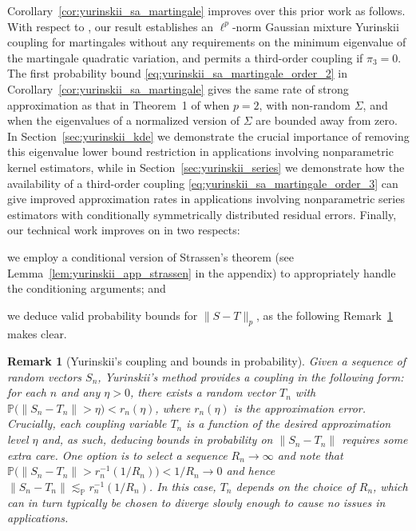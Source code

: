 \documentclass[11pt,lof]{puthesis}
\renewcommand{\P}{\ensuremath{\mathbb{P}}}
\theoremstyle{break}
\newtheorem{remark}{Remark}[section]
\theoremstyle{proof}
\begin{document}
Corollary~\ref{cor:yurinskii_sa_martingale} improves over this prior work as
follows.
With respect to \citet{li2020uniform}, our result establishes an $\ell^p$-norm
Gaussian mixture Yurinskii coupling for martingales without any requirements on
the minimum eigenvalue of the martingale quadratic variation, and permits a
third-order coupling if $\pi_3=0$. The first probability bound
\eqref{eq:yurinskii_sa_martingale_order_2} in
Corollary~\ref{cor:yurinskii_sa_martingale} gives the
same rate of strong approximation as that in Theorem~1 of \citet{li2020uniform}
when $p=2$, with non-random $\Sigma$, and when the eigenvalues of a normalized
version of $\Sigma$ are bounded away from zero. In
Section~\ref{sec:yurinskii_kde} we
demonstrate the crucial importance of removing this eigenvalue lower bound
restriction in applications involving nonparametric kernel estimators, while in
Section~\ref{sec:yurinskii_series} we demonstrate how the availability of a
third-order coupling \eqref{eq:yurinskii_sa_martingale_order_3} can give
improved approximation rates in applications involving nonparametric series
estimators with conditionally symmetrically distributed residual errors.
Finally, our technical work improves on \citet{li2020uniform} in two respects:
%
\begin{inlineroman}
  \item
    we employ a conditional version
    of Strassen's theorem (see Lemma~\ref{lem:yurinskii_app_strassen}
    in the appendix)
    to appropriately handle the conditioning arguments; and
  \item
    we deduce valid
    probability bounds for $\|S-T\|_p$, as the following
    Remark~\ref{rem:yurinskii_coupling_bounds_probability} makes clear.
\end{inlineroman}

\begin{remark}[Yurinskii's coupling and bounds in probability]
  \label{rem:yurinskii_coupling_bounds_probability}
  Given a sequence of random vectors $S_n$, Yurinskii's method provides a
  coupling in the following form: for each $n$ and any $\eta > 0$, there exists
  a random vector $T_n$ with $\P\big(\|S_n - T_n\| > \eta\big) < r_n(\eta)$,
  where $r_n(\eta)$ is the approximation error. Crucially, each coupling
  variable $T_n$ is a function of the desired approximation level $\eta$ and,
  as such, deducing bounds in probability on $\|S_n - T_n\|$ requires some
  extra care. One option is to select a sequence $R_n \to \infty$ and note that
  $\P\big(\|S_n - T_n\| > r_n^{-1}(1 / R_n)\big) < 1 / R_n \to 0$ and hence
  $\|S_n - T_n\| \lesssim_\P r_n^{-1}(1 / R_n)$. In this case, $T_n$ depends on
  the choice of $R_n$, which can in turn typically be chosen to diverge slowly
  enough to cause no issues in applications.
\end{remark}
\end{document}
